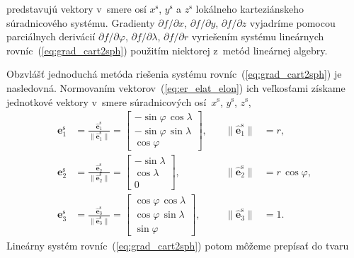 \documentclass[a4paper, 12pt]{book}
\let\vec\mathbf
\begin{document}
%
predstavujú vektory v~smere osí $x^{\mathrm{s}}$, $y^{\mathrm{s}}$ 
a $z^{\mathrm{s}}$ lokálneho karteziánskeho súradnicového systému.  Gradienty 
$\partial f \slash \partial x$, $\partial f \slash \partial y$, $\partial 
f \slash \partial z$ vyjadríme pomocou parciálnych derivácií $\partial f \slash 
\partial \varphi$, $\partial f \slash \partial \lambda$, $\partial f \slash 
\partial r$ vyriešením systému lineárnych rovníc~(\ref{eq:grad_cart2sph}) 
použitím niektorej z~metód lineárnej algebry.

Obzvlášť jednoduchá metóda riešenia systému rovníc~(\ref{eq:grad_cart2sph}) je 
nasledovná.  Normovaním vektorov~(\ref{eq:er_elat_elon}) ich veľkosťami získame 
jednotkové vektory v~smere súradnicových osí~$x^\mathrm{s}$, $y^\mathrm{s}$, 
$z^\mathrm{s}$,
%
\begin{equation}
\label{eq:er_elat_elon_unit}
\begin{aligned}
%
\vec e^\mathrm{s}_1 &= \frac{\hat{\vec e}_1^\mathrm{s}}{\| \hat{\vec 
e}_1^\mathrm{s} \|} = 
%
\begin{bmatrix}
-\sin\varphi \, \cos\lambda\\
-\sin\varphi \, \sin\lambda\\
\cos\varphi
\end{bmatrix}
%
{,} \quad &\| \hat{\vec e}_1^\mathrm{s} \| &= r{,}\\
%
\vec e^\mathrm{s}_2 &= \frac{\hat{\vec e}_2^\mathrm{s}}{\| \hat{\vec 
e}_2^\mathrm{s} \|} = 
%
\begin{bmatrix}
-\sin\lambda\\
\cos\lambda\\
0
\end{bmatrix}
%
{,}  \quad &\| \hat{\vec e}_2^\mathrm{s} \| &= r \, \cos\varphi{,}\\
%
\vec e^\mathrm{s}_3 &= \frac{\hat{\vec e}_3^\mathrm{s}}{\| \hat{\vec 
e}_3^\mathrm{s} \|} = 
%
\begin{bmatrix}
\cos\varphi \, \cos\lambda\\
\cos\varphi \, \sin\lambda\\
\sin\varphi
\end{bmatrix}
%
{,} \quad &\| \hat{\vec e}_3^\mathrm{s} \| &= 1{.}
%
\end{aligned}
\end{equation}
%
Lineárny systém rovníc~(\ref{eq:grad_cart2sph}) potom môžeme prepísať do tvaru
%
\end{document}
